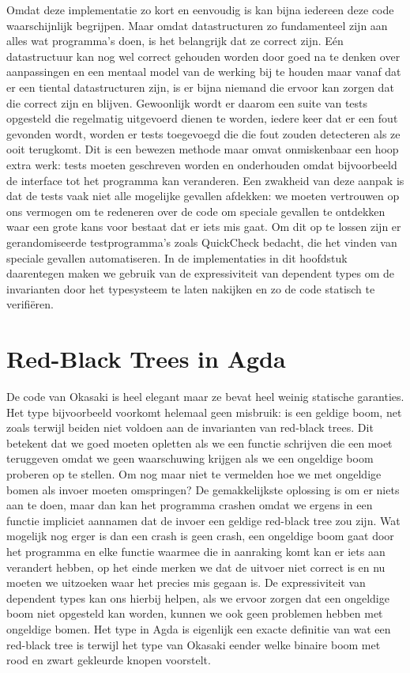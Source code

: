 Omdat deze implementatie zo kort en eenvoudig is kan bijna iedereen deze code
waarschijnlijk begrijpen. Maar omdat datastructuren zo fundamenteel zijn aan
alles wat programma's doen, is het belangrijk dat ze correct zijn. Eén
datastructuur kan nog wel correct gehouden worden door goed na te denken over
aanpassingen en een mentaal model van de werking bij te houden maar vanaf dat
er een tiental datastructuren zijn, is er bijna niemand die ervoor kan zorgen
dat die correct zijn en blijven. Gewoonlijk wordt er daarom een suite van tests
opgesteld die regelmatig uitgevoerd dienen te worden, iedere keer dat er een
fout gevonden wordt, worden er tests toegevoegd die die fout zouden detecteren
als ze ooit terugkomt. Dit is een bewezen methode maar omvat onmiskenbaar een
hoop extra werk: tests moeten geschreven worden en onderhouden omdat
bijvoorbeeld de interface tot het programma kan veranderen. Een zwakheid van
deze aanpak is dat de tests vaak niet alle mogelijke gevallen afdekken: we
moeten vertrouwen op ons vermogen om te redeneren over de code om speciale
gevallen te ontdekken waar een grote kans voor bestaat dat er iets mis gaat. Om
dit op te lossen zijn er gerandomiseerde testprogramma's zoals QuickCheck
\cite{quickcheck} bedacht, die het vinden van speciale gevallen automatiseren.
In de implementaties in dit hoofdstuk daarentegen maken we gebruik van de
expressiviteit van dependent types om de invarianten door het typesysteem te
laten nakijken en zo de code statisch te verifiëren.


\section{Red-Black Trees in Agda}

De code van Okasaki is heel elegant maar ze bevat heel weinig statische
garanties. Het  type bijvoorbeeld voorkomt helemaal geen misbruik:
 is een geldige boom, net zoals  terwijl beiden niet voldoen aan de invarianten van red-black trees.
Dit betekent dat we goed moeten opletten als we een functie schrijven die een
 moet teruggeven omdat we geen waarschuwing krijgen als we een
ongeldige boom proberen op te stellen. Om nog maar niet te vermelden hoe we met
ongeldige bomen als invoer moeten omspringen? De gemakkelijkste oplossing is om
er niets aan te doen, maar dan kan het programma crashen omdat we ergens in een
functie impliciet aannamen dat de invoer een geldige red-black tree zou zijn.
Wat mogelijk nog erger is dan een crash is geen crash, een ongeldige boom gaat
door het programma en elke functie waarmee die in aanraking komt kan er iets
aan verandert hebben, op het einde merken we dat de uitvoer niet correct is
en nu moeten we uitzoeken waar het precies mis gegaan is. De expressiviteit van
dependent types kan ons hierbij helpen, als we ervoor zorgen dat een ongeldige
boom niet opgesteld kan worden, kunnen we ook geen problemen hebben met
ongeldige bomen. Het  type in Agda is eigenlijk een exacte
definitie van wat een red-black tree is terwijl het  type van
Okasaki eender welke binaire boom met rood en zwart gekleurde knopen voorstelt.

